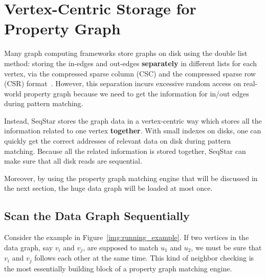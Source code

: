 \section{Vertex-Centric Storage for Property Graph}\label{sec:storage}

Many graph computing frameworks store graphs on disk using the double list method:
storing the in-edges and out-edges \textbf{separately} in different lists for each vertex,
via the compressed sparse column (CSC) and the compressed sparse row (CSR) format~\cite{DBLP:conf/sc/PearceGA10}.
However, this separation incurs excessive random access on real-world property graph because we need to get the information for in/out edges during pattern matching.

Instead, SeqStar stores the graph data in a vertex-centric way which stores all the information related to one vertex \textbf{together}.
With small indexes on disks, one can quickly get the correct addresses of relevant data on disk during pattern matching. Because all the related information is stored together, SeqStar can make sure that all disk reads are sequential.

Moreover, by using the property graph matching engine that will be discussed in the next section,
the huge data graph will be loaded at most once.
\subsection{Scan the Data Graph Sequentially}

Consider the example in Figure~\ref{img:running_example}.
If two vertices in the data graph, say $v_i$ and $v_j$, are supposed to match $u_1$ and $u_2$,
we must be sure that $v_i$ and $v_j$ follows each other at the same time.
This kind of neighbor checking is the most essentially building block of a property graph matching engine.

